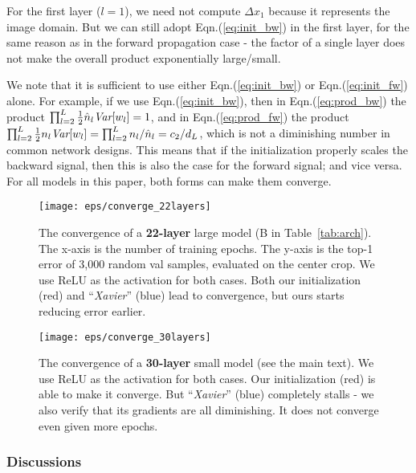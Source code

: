 \documentclass[10pt,twocolumn,letterpaper]{article}
\newcommand{\var}{\emph{Var}}
\begin{document}
For the first layer ($l=1$), we need not compute $\Delta x_1$ because it represents the image domain. But we can still adopt Eqn.(\ref{eq:init_bw}) in the first layer, for the same reason as in the forward propagation case - the factor of a single layer does not make the overall product exponentially large/small.

We note that it is sufficient to use either Eqn.(\ref{eq:init_bw}) or Eqn.(\ref{eq:init_fw}) alone. For example, if we use Eqn.(\ref{eq:init_bw}), then in Eqn.(\ref{eq:prod_bw}) the product $\prod_{l=2}^{L}\frac{1}{2}\hat{n}_{l}\var[w_{l}]=1$, and in Eqn.(\ref{eq:prod_fw}) the product $\prod_{l=2}^{L}\frac{1}{2}n_l\var[w_{l}]=\prod_{l=2}^{L}n_l/\hat{n}_{l}=c_{2}/d_{L}$, which is not a diminishing number in common network designs. This means that if the initialization properly scales the backward signal, then this is also the case for the forward signal; and vice versa.
For all models in this paper, both forms can make them converge.

\begin{figure}[t]
\begin{center}
\texttt{[image: eps/converge\_22layers]}
\end{center}
\caption{The convergence of a \textbf{22-layer} large model (B in Table~\ref{tab:arch}). The x-axis is the number of training epochs. The y-axis is the top-1 error of 3,000 random val samples, evaluated on the center crop. We use ReLU as the activation for both cases. Both our initialization (red) and ``\emph{Xavier}'' (blue) \cite{Glorot2010} lead to convergence, but ours starts reducing error earlier.}
\label{fig:converge_22layers}
\begin{center}
\texttt{[image: eps/converge\_30layers]}
\end{center}
\caption{The convergence of a \textbf{30-layer} small model (see the main text). We use ReLU as the activation for both cases. Our initialization (red) is able to make it converge. But ``\emph{Xavier}'' (blue) \cite{Glorot2010} completely stalls - we also verify that its gradients are all diminishing. It does not converge even given more epochs.}
\label{fig:converge_30layers}
\end{figure}

\subsubsection*{Discussions}
\end{document}
